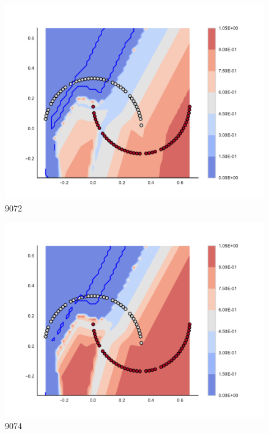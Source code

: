 \begin{subfigure}[b]{0.09\textwidth}
    \includegraphics[clip, trim=2.35cm 1.75cm 4.5cm 0cm,width=\textwidth]{img/convergence/9072.pdf}
    \caption{9072}
    \label{fig:convergence_9072}
\end{subfigure}
%
\begin{subfigure}[b]{0.09\textwidth}
    \includegraphics[clip, trim=2.35cm 1.75cm 4.5cm 0cm,width=\textwidth]{img/convergence/9074.pdf}
    \caption{9074}
    \label{fig:convergence_9074}
\end{subfigure}
%
